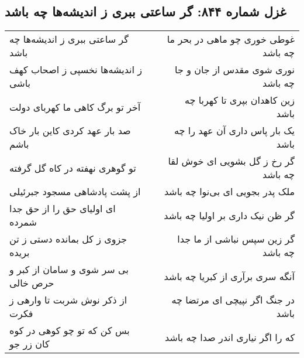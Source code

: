 \begin{center}
\section*{غزل شماره ۸۴۴: گر ساعتی ببری ز اندیشه‌ها چه باشد}
\label{sec:0844}
\begin{longtable}{l p{0.5cm} r}
گر ساعتی ببری ز اندیشه‌ها چه باشد
&&
غوطی خوری چو ماهی در بحر ما چه باشد
\\
ز اندیشه‌ها نخسپی ز اصحاب کهف باشی
&&
نوری شوی مقدس از جان و جا چه باشد
\\
آخر تو برگ کاهی ما کهربای دولت
&&
زین کاهدان بپری تا کهربا چه باشد
\\
صد بار عهد کردی کاین بار خاک باشم
&&
یک بار پاس داری آن عهد را چه باشد
\\
تو گوهری نهفته در کاه گل گرفته
&&
گر رخ ز گل بشویی ای خوش لقا چه باشد
\\
از پشت پادشاهی مسجود جبرئیلی
&&
ملک پدر بجویی ای بی‌نوا چه باشد
\\
ای اولیای حق را از حق جدا شمرده
&&
گر ظن نیک داری بر اولیا چه باشد
\\
جزوی ز کل بمانده دستی ز تن بریده
&&
گر زین سپس نباشی از ما جدا چه باشد
\\
بی سر شوی و سامان از کبر و حرص خالی
&&
آنگه سری برآری از کبریا چه باشد
\\
از ذکر نوش شربت تا وارهی ز فکرت
&&
در جنگ اگر نپیچی ای مرتضا چه باشد
\\
بس کن که تو چو کوهی در کوه کان زر جو
&&
که را اگر نیاری اندر صدا چه باشد
\\
\end{longtable}
\end{center}
